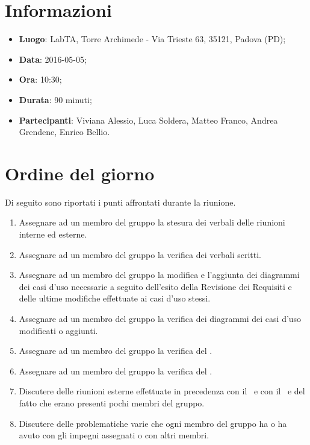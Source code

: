 \documentclass[a4paper,titlepage]{article}
\begin{document}
\maketitle

\begin{diario}
\end{diario}

\newpage
\tableofcontents

\newpage
\section{Informazioni}
\label{sec:Informazioni}

\begin{itemize}
 \item \textbf{Luogo}: LabTA, Torre Archimede - Via Trieste 63, 35121, Padova (PD);
 \item \textbf{Data}: 2016-05-05;
 \item \textbf{Ora}: 10:30;
 \item \textbf{Durata}: 90 minuti;
 \item \textbf{Partecipanti}: Viviana Alessio, Luca Soldera, Matteo Franco, Andrea Grendene, Enrico Bellio.
\end{itemize}

\section{Ordine del giorno}
\label{sec:Ordine del giorno}
Di seguito sono riportati i punti affrontati durante la riunione.

\begin{enumerate}
	\item Assegnare ad un membro del gruppo la stesura dei verbali delle riunioni interne ed esterne.
	\item Assegnare ad un membro del gruppo la verifica dei verbali scritti.
	\item Assegnare ad un membro del gruppo la modifica e l'aggiunta dei diagrammi dei casi d'uso necessarie a seguito dell'esito della Revisione dei Requisiti e delle ultime modifiche effettuate ai casi d'uso stessi.
	\item Assegnare ad un membro del gruppo la verifica dei diagrammi dei casi d'uso modificati o aggiunti.
	\item Assegnare ad un membro del gruppo la verifica del \PQdoc.
	\item Assegnare ad un membro del gruppo la verifica del \PPdoc.
	\item Discutere delle riunioni esterne effettuate in precedenza con il \COMMITTENTE\ e con il \CARDIN\ e del fatto che erano presenti pochi membri del gruppo.
	\item Discutere delle problematiche varie che ogni membro del gruppo ha o ha avuto con gli impegni assegnati o con altri membri.
\end{enumerate}
\end{document}
